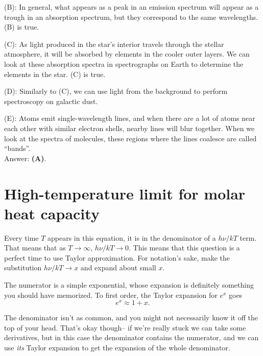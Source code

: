 \documentclass[11pt]{paper}
\newcommand{\answer}[1]{Answer: \textbf{(#1)}.}
\begin{document}
(B):  In general, what appears as a peak in an emission spectrum will appear as a trough in an absorption spectrum, but they correspond to the same wavelengths.  (B) is true.

(C):  As light produced in the star's interior travels through the stellar atmosphere, it will be absorbed by elements in the cooler outer layers.  We can look at these absorption spectra in spectrographs on Earth to determine the elements in the star.  (C) is true.

(D):  Similarly to (C), we can use light from the background to perform spectroscopy on galactic dust.

(E):  Atoms emit single-wavelength lines, and when there are a lot of atoms near each other with similar electron shells, nearby lines will blur together.  When we look at the spectra of molecules, these regions where the lines coalesce are called ``bands''.\\

\answer{A}

\section{High-temperature limit for molar heat capacity}

Every time $T$ appears in this equation, it is in the denominator of a $h\nu/kT$ term.  That means that as $T\rightarrow \infty$, $h\nu/kT\rightarrow0$.  This means that this question is a perfect time to use Taylor approximation.  For notation's sake, make the substitution $h\nu/kT\rightarrow x$ and expand about small $x$.

The numerator is a simple exponential, whose expansion is definitely something you should have memorized.  To first order, the Taylor expansion for $e^x$ goes
\begin{equation}
e^x \approx 1 + x.
\end{equation}

The denominator isn't as common, and you might not necessarily know it off the top of your head.  That's okay though\--- if we're really stuck we can take some derivatives, but in this case the denominator contains the numerator, and we can use \emph{its} Taylor expansion to get the expansion of the whole denominator.
\end{document}
